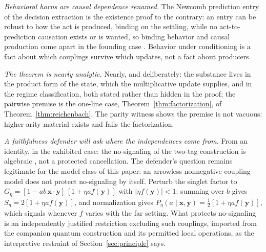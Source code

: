 \documentclass[11pt]{article}
\begin{document}
\emph{Behavioral horns are causal dependence renamed.} The Newcomb prediction entry of the decision extraction is the existence proof to the contrary: an entry can be robust to how the act is produced, binding on the settling, while no act-to-prediction causation exists or is wanted, so binding behavior and causal production come apart in the founding case \cite{AethusDecision}. Behavior under conditioning is a fact about which couplings survive which updates, not a fact about producers.

\emph{The theorem is nearly analytic.} Nearly, and deliberately: the substance lives in the product form of the state, which the multiplicative update supplies, and in the regime classification, both stated rather than hidden in the proof; the pairwise premise is the one-line case, Theorem~\ref{thm:factorization}, of Theorem~\ref{thm:reichenbach}. The parity witness shows the premise is not vacuous: higher-arity material exists and fails the factorization.

\emph{A faithfulness defender will ask where the independences come from.} From an identity, in the exhibited case: the no-signaling of the two-tag construction is algebraic \cite{AethusQuant}, not a protected cancellation. The defender's question remains legitimate for the model class of this paper: an arrowless nonnegative coupling model does not protect no-signaling by itself. Perturb the singlet factor to $G_\eta = [1 - ab\,\mathbf{x}\cdot\mathbf{y}]\,[1 + \eta a f(\mathbf{y})]$ with $|\eta f(\mathbf{y})| < 1$: summing over $b$ gives $S_\eta = 2[1 + \eta a f(\mathbf{y})]$, and normalization gives $P_\eta(a \mid \mathbf{x}, \mathbf{y}) = \tfrac{1}{2}[1 + \eta a f(\mathbf{y})]$, which signals whenever $f$ varies with the far setting. What protects no-signaling is an independently justified restriction excluding such couplings, imported from the companion quantum construction and its permitted local operations, as the interpretive restraint of Section~\ref{sec:principle} says.
\end{document}
